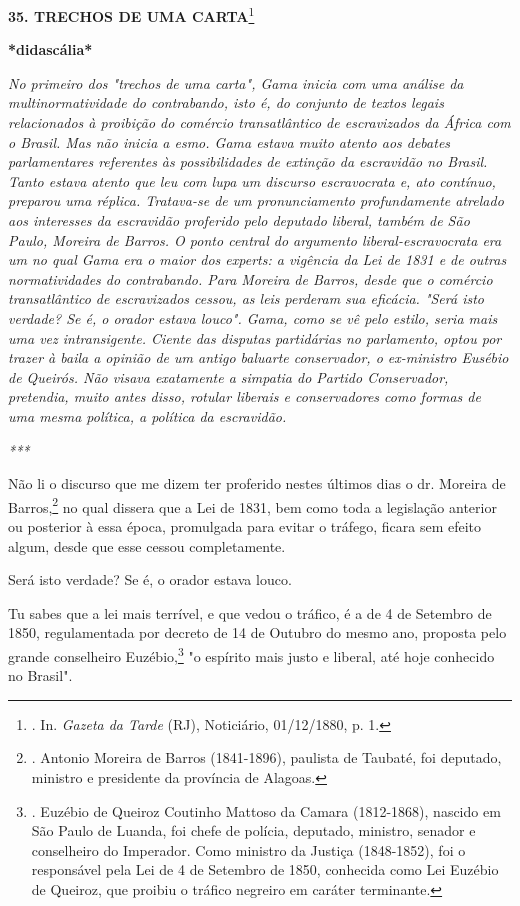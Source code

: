 \textbf{35. TRECHOS DE UMA CARTA}\footnote{. In. \emph{Gazeta da Tarde}
  (RJ), Noticiário, 01/12/1880, p. 1.}

\textbf{*didascália*}

\emph{No primeiro dos "trechos de uma carta", Gama inicia com uma
análise da multinormatividade do contrabando, isto é, do conjunto de
textos legais relacionados à proibição do comércio transatlântico de
escravizados da África com o Brasil. Mas não inicia a esmo. Gama estava
muito atento aos debates parlamentares referentes às possibilidades de
extinção da escravidão no Brasil. Tanto estava atento que leu com lupa
um discurso escravocrata e, ato contínuo, preparou uma réplica.
Tratava-se de um pronunciamento profundamente atrelado aos interesses da
escravidão proferido pelo deputado liberal, também de São Paulo, Moreira
de Barros. O ponto central do argumento liberal-escravocrata era um no
qual Gama era o maior dos experts: a vigência da Lei de 1831 e de outras
normatividades do contrabando. Para Moreira de Barros, desde que o
comércio transatlântico de escravizados cessou, as leis perderam sua
eficácia. "Será isto verdade? Se é, o orador estava louco". Gama, como
se vê pelo estilo, seria mais uma vez intransigente. Ciente das disputas
partidárias no parlamento, optou por trazer à baila a opinião de um
antigo baluarte conservador, o ex-ministro Eusébio de Queirós. Não
visava exatamente a simpatia do Partido Conservador, pretendia, muito
antes disso, rotular liberais e conservadores como formas de uma mesma
política, a política da escravidão. }

\emph{***}

Não li o discurso que me dizem ter proferido nestes últimos dias o dr.
Moreira de Barros,\footnote{. Antonio Moreira de Barros (1841-1896),
  paulista de Taubaté, foi deputado, ministro e presidente da província
  de Alagoas.} no qual dissera que a Lei de 1831, bem como toda a
legislação anterior ou posterior à essa época, promulgada para evitar o
tráfego, ficara sem efeito algum, desde que esse cessou completamente.

Será isto verdade? Se é, o orador estava louco.

Tu sabes que a lei mais terrível, e que vedou o tráfico, é a de 4 de
Setembro de 1850, regulamentada por decreto de 14 de Outubro do mesmo
ano, proposta pelo grande conselheiro Euzébio,\footnote{. Euzébio de
  Queiroz Coutinho Mattoso da Camara (1812-1868), nascido em São Paulo
  de Luanda, foi chefe de polícia, deputado, ministro, senador e
  conselheiro do Imperador. Como ministro da Justiça (1848-1852), foi o
  responsável pela Lei de 4 de Setembro de 1850, conhecida como Lei
  Euzébio de Queiroz, que proibiu o tráfico negreiro em caráter
  terminante.} "o espírito mais justo e liberal, até hoje conhecido no
Brasil".


